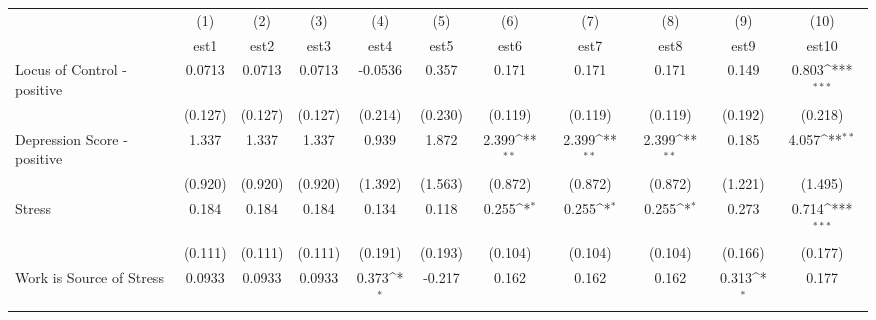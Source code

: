{
\def\sym#1{\ifmmode^{#1}\else\(^{#1}\)\fi}
\begin{tabular}{l*{10}{c}}
\toprule
            &\multicolumn{1}{c}{(1)}&\multicolumn{1}{c}{(2)}&\multicolumn{1}{c}{(3)}&\multicolumn{1}{c}{(4)}&\multicolumn{1}{c}{(5)}&\multicolumn{1}{c}{(6)}&\multicolumn{1}{c}{(7)}&\multicolumn{1}{c}{(8)}&\multicolumn{1}{c}{(9)}&\multicolumn{1}{c}{(10)}\\
            &\multicolumn{1}{c}{est1}&\multicolumn{1}{c}{est2}&\multicolumn{1}{c}{est3}&\multicolumn{1}{c}{est4}&\multicolumn{1}{c}{est5}&\multicolumn{1}{c}{est6}&\multicolumn{1}{c}{est7}&\multicolumn{1}{c}{est8}&\multicolumn{1}{c}{est9}&\multicolumn{1}{c}{est10}\\
\midrule
Locus of Control - positive&      0.0713         &      0.0713         &      0.0713         &     -0.0536         &       0.357         &       0.171         &       0.171         &       0.171         &       0.149         &       0.803\sym{***}\\
            &     (0.127)         &     (0.127)         &     (0.127)         &     (0.214)         &     (0.230)         &     (0.119)         &     (0.119)         &     (0.119)         &     (0.192)         &     (0.218)         \\
\addlinespace
Depression Score - positive&       1.337         &       1.337         &       1.337         &       0.939         &       1.872         &       2.399\sym{**} &       2.399\sym{**} &       2.399\sym{**} &       0.185         &       4.057\sym{**} \\
            &     (0.920)         &     (0.920)         &     (0.920)         &     (1.392)         &     (1.563)         &     (0.872)         &     (0.872)         &     (0.872)         &     (1.221)         &     (1.495)         \\
\addlinespace
Stress      &       0.184         &       0.184         &       0.184         &       0.134         &       0.118         &       0.255\sym{*}  &       0.255\sym{*}  &       0.255\sym{*}  &       0.273         &       0.714\sym{***}\\
            &     (0.111)         &     (0.111)         &     (0.111)         &     (0.191)         &     (0.193)         &     (0.104)         &     (0.104)         &     (0.104)         &     (0.166)         &     (0.177)         \\
\addlinespace
Work is Source of Stress&      0.0933         &      0.0933         &      0.0933         &       0.373\sym{*}  &      -0.217         &       0.162         &       0.162         &       0.162         &       0.313\sym{*}  &       0.177         \\

\end{tabular}}
